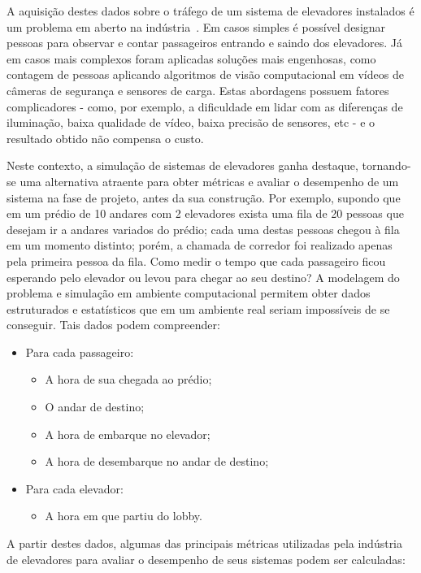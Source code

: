 A aquisição destes dados sobre o tráfego de um sistema de elevadores instalados
é um problema em aberto na indústria~\cite{KOEHLEROTTIGER02}. Em casos simples é
possível designar pessoas para observar e contar passageiros entrando e saindo
dos elevadores. Já em casos mais complexos foram aplicadas soluções mais
engenhosas, como contagem de pessoas aplicando algoritmos de visão computacional
em vídeos de câmeras de segurança e sensores de carga. Estas abordagens possuem
fatores complicadores - como, por exemplo, a dificuldade em lidar com as
diferenças de iluminação, baixa qualidade de vídeo, baixa precisão de sensores,
etc - e o resultado obtido não compensa o custo.

Neste contexto, a simulação de sistemas de elevadores ganha destaque, tornando-
se uma alternativa atraente para obter métricas e avaliar o desempenho de um
sistema na fase de projeto, antes da sua construção. Por exemplo, supondo que em
um prédio de 10 andares com 2 elevadores exista uma fila de 20 pessoas que
desejam ir a andares variados do prédio; cada uma destas pessoas chegou à fila
em um momento distinto; porém, a chamada de corredor foi realizado apenas pela
primeira pessoa da fila. Como medir o tempo que cada passageiro ficou esperando
pelo elevador ou levou para chegar ao seu destino? A modelagem do problema e
simulação em ambiente computacional permitem obter dados estruturados e
estatísticos que em um ambiente real seriam impossíveis de se conseguir. Tais
dados podem compreender:

\begin{itemize}
  \item Para cada passageiro:
  \begin{itemize}
    \item A hora de sua chegada ao prédio;
    \item O andar de destino;
    \item A hora de embarque no elevador;
    \item A hora de desembarque no andar de destino;
  \end{itemize}
  \item Para cada elevador:
  \begin{itemize}
    \item A hora em que partiu do lobby.
  \end{itemize}
\end{itemize}

A partir destes dados, algumas das principais métricas utilizadas pela indústria
de elevadores para avaliar o desempenho de seus sistemas podem ser calculadas:

